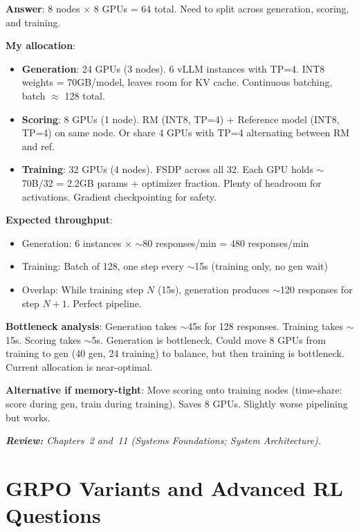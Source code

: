 \begin{questionbox}
\textbf{Answer}: 8 nodes $\times$ 8 GPUs = 64 total. Need to split across generation, scoring, and training.

\textbf{My allocation}:

\begin{itemize}
  \item \textbf{Generation}: 24 GPUs (3 nodes). 6 vLLM instances with TP=4. INT8 weights = 70GB/model, leaves room for KV cache. Continuous batching, batch $\approx$ 128 total.
  \item \textbf{Scoring}: 8 GPUs (1 node). RM (INT8, TP=4) + Reference model (INT8, TP=4) on same node. Or share 4 GPUs with TP=4 alternating between RM and ref.
  \item \textbf{Training}: 32 GPUs (4 nodes). FSDP across all 32. Each GPU holds $\sim$70B/32 = 2.2GB params + optimizer fraction. Plenty of headroom for activations. Gradient checkpointing for safety.
\end{itemize}

\textbf{Expected throughput}:

\begin{itemize}
  \item Generation: 6 instances $\times$ $\sim$80 responses/min = 480 responses/min
  \item Training: Batch of 128, one step every $\sim$15s (training only, no gen wait)
  \item Overlap: While training step $N$ (15s), generation produces $\sim$120 responses for step $N+1$. Perfect pipeline.
\end{itemize}

\textbf{Bottleneck analysis}: Generation takes $\sim$45s for 128 responses. Training takes $\sim$15s. Scoring takes $\sim$5s. Generation is bottleneck. Could move 8 GPUs from training to gen (40 gen, 24 training) to balance, but then training is bottleneck. Current allocation is near-optimal.

\textbf{Alternative if memory-tight}: Move scoring onto training nodes (time-share: score during gen, train during training). Saves 8 GPUs. Slightly worse pipelining but works.

\emph{\textbf{Review:} Chapters~2 and~11 (Systems Foundations; System Architecture).}
\end{questionbox}

\section{GRPO Variants and Advanced RL Questions}
\label{grpo-variants-and-advanced-rl-questions}

